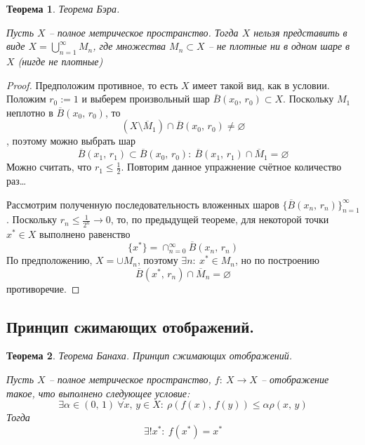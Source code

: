 \documentclass[a4paper,12pt]{article}
\renewcommand{\leq}{\ensuremath{\leqslant}}
\renewcommand{\emptyset}{\ensuremath{\varnothing}}
\theoremstyle{plain}
\newtheorem{theorem}{Теорема}[section]
\theoremstyle{definition}
\theoremstyle{remark}
\begin{document}
\begin{theorem}
	Теорема Бэра.

	Пусть $X$ -- полное метрическое пространство. Тогда $X$ нельзя представить в виде $X = \bigcup_{n = 1}^\infty M_n$, где множества $M_n \subset X$ -- не плотные ни в одном шаре в $X$ (нигде не плотные)
\end{theorem}

\begin{proof}
	Предположим противное, то есть $X$ имеет такой вид, как в условии. Положим $r_0 := 1$ и выберем произвольный шар $\overline{B}(x_0,\, r_0) \subset X$. Поскольку $M_1$ неплотно в $\overline{B}(x_0,\, r_0)$, то
	\[
		(X \setminus \overline{M}_1) \cap \overline{B}(x_0,\, r_0) \neq \emptyset
	\], поэтому можно выбрать шар
	\[
		\overline{B}(x_1,\, r_1) \subset \overline{B}(x_0,\, r_0) :\: \overline{B}(x_1,\, r_1) \cap \overline{M}_1 = \emptyset
	\]
	Можно считать, что $r_1 \leq \frac{1}{2}$. Повторим данное упражнение счётное количество раз\dots

	Рассмотрим полученную последовательность вложенных шаров $\{\overline{B}(x_n,\,r_n)\}_{n = 1}^\infty$. Поскольку $r_n \leq \frac{1}{2^n} \to 0$, то, по предыдущей теореме, для некоторой точки $x^* \in X$ выполнено равенство
	\[
		\{x^*\} = \cap_{n = 0}^\infty\overline{B}(x_n,\, r_n)
	\]
	По предположению, $X = \cup M_n$, поэтому $\exists n :\: x^* \in M_n$, но по построению
	\[
		\overline{B}(x^*,\, r_n) \cap \overline{M}_n = \emptyset
	\]
	противоречие.
\end{proof}

\subsection{Принцип сжимающих отображений.}
\begin{theorem}
	Теорема Банаха. Принцип сжимающих отображений.

	Пусть $X$ -- полное метрическое пространство, $f :\: X \to X$ -- отображение такое, что выполнено следующее условие:
	\[
		\exists \alpha \in (0,\, 1) \: \forall x,\, y \in X :\: \rho(f(x),\, f(y)) \leq \alpha\rho(x,\,y)
	\]
	Тогда
	\[
		\exists ! x^* :\: f(x^*) = x^*
	\]
\end{theorem}
\end{document}
